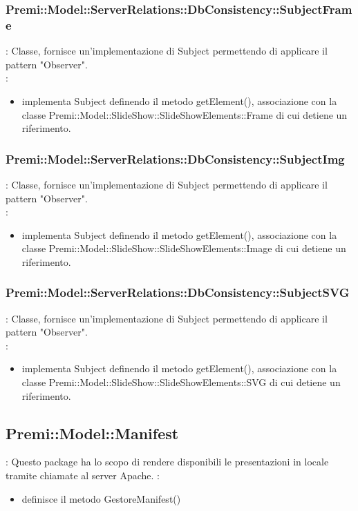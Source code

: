 {            \subsubsection{Premi::Model::ServerRelations::DbConsistency::SubjectFrame}{
				\textbf{\tipo}: Classe, fornisce un’implementazione di Subject permettendo di applicare il pattern "Observer".\\	
				\textbf{\relaz}: 
				\begin{itemize}
					\item implementa Subject definendo il metodo getElement(), associazione con la classe Premi::Model::SlideShow::SlideShowElements::Frame di cui detiene un riferimento.
				\end{itemize}	
            }
            
            \subsubsection{Premi::Model::ServerRelations::DbConsistency::SubjectImg}{
				\textbf{\tipo}: Classe, fornisce un’implementazione di Subject permettendo di applicare il pattern "Observer".\\	
				\textbf{\relaz}: 
				\begin{itemize}
					\item implementa Subject definendo il metodo getElement(), associazione con la classe Premi::Model::SlideShow::SlideShowElements::Image di cui detiene un riferimento.
				\end{itemize}	
            }
            
            \subsubsection{Premi::Model::ServerRelations::DbConsistency::SubjectSVG}{
				\textbf{\tipo}: Classe, fornisce un’implementazione di Subject permettendo di applicare il pattern "Observer".\\	
				\textbf{\relaz}: 
				\begin{itemize}
					\item implementa Subject definendo il metodo getElement(), associazione con la classe Premi::Model::SlideShow::SlideShowElements::SVG di cui detiene un riferimento.
				\end{itemize}	
            }
}
\subsection{Premi::Model::Manifest}{
   	\textbf{\tipo}: Questo package ha lo scopo di rendere disponibili le presentazioni in locale tramite chiamate al server Apache.
   	\textbf{\relaz}:
   	\begin{itemize}
   		\item definisce il metodo GestoreManifest()
   	\end{itemize}
}
